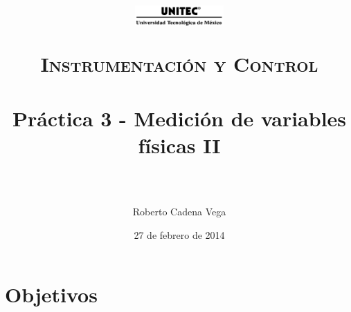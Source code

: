 



\title{	
	\normalfont \normalsize
	\begin{figure}[h]
		\begin{center}
			\includegraphics[width=0.3\textwidth]{../../images/UNITEC.png} %
		\end{center}
	\end{figure}
	\textsc{Instrumentación y Control} \\ [25pt]
	\horrule{0.5pt} \\[0.4cm] %
	\huge Práctica 3 - Medición de variables físicas II \\ %
	\horrule{2pt} \\[0.5cm] %
}

\author{Roberto Cadena Vega} %

\date{\normalsize 27 de febrero de 2014} %




\maketitle %


\section{Objetivos}

